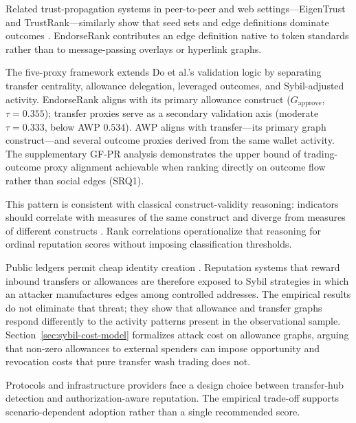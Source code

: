 Related trust-propagation systems in peer-to-peer and web settings---EigenTrust and TrustRank---similarly show that seed sets and edge definitions dominate outcomes . EndorseRank contributes an edge definition native to token standards rather than to message-passing overlays or hyperlink graphs.


The five-proxy framework extends Do et al.'s validation logic by separating transfer centrality, allowance delegation, leveraged outcomes, and Sybil-adjusted activity. EndorseRank aligns with its primary allowance construct ($G_{\text{approve}}$, $\tau=0.355$); transfer proxies serve as a secondary validation axis (moderate $\tau=0.333$, below AWP $0.534$). AWP aligns with transfer---its primary graph construct---and several outcome proxies derived from the same wallet activity. The supplementary GF-PR analysis demonstrates the upper bound of trading-outcome proxy alignment achievable when ranking directly on outcome flow rather than social edges (SRQ1).

This pattern is consistent with classical construct-validity reasoning: indicators should correlate with measures of the same construct and diverge from measures of different constructs . Rank correlations  operationalize that reasoning for ordinal reputation scores without imposing classification thresholds.


Public ledgers permit cheap identity creation . Reputation systems that reward inbound transfers or allowances are therefore exposed to Sybil strategies in which an attacker manufactures edges among controlled addresses. The empirical results do not eliminate that threat; they show that allowance and transfer graphs respond differently to the activity patterns present in the observational sample. Section~\ref{sec:sybil-cost-model} formalizes attack cost on allowance graphs, arguing that non-zero allowances to external spenders can impose opportunity and revocation costs that pure transfer wash trading does not.


Protocols and infrastructure providers face a design choice between transfer-hub detection and authorization-aware reputation. The empirical trade-off supports scenario-dependent adoption rather than a single recommended score.


